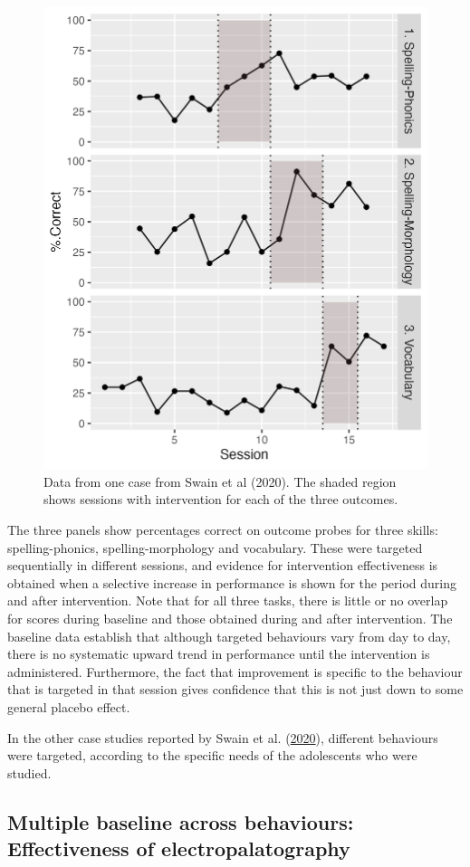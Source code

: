 \documentclass{krantz}
\begin{document}
\begin{figure}
\includegraphics[width=0.6\linewidth]{images_bw/swainplot} \caption{Data from one case from  Swain et al (2020). The shaded region shows sessions with intervention for each of the three outcomes.}\label{fig:swainfig}
\end{figure}

The three panels show percentages correct on outcome probes for three skills: spelling-phonics, spelling-morphology and vocabulary. These were targeted sequentially in different sessions, and evidence for intervention effectiveness is obtained when a selective increase in performance is shown for the period during and after intervention. Note that for all three tasks, there is little or no overlap for scores during baseline and those obtained during and after intervention. The baseline data establish that although targeted behaviours vary from day to day, there is no systematic upward trend in performance until the intervention is administered. Furthermore, the fact that improvement is specific to the behaviour that is targeted in that session gives confidence that this is not just down to some general placebo effect.

In the other case studies reported by Swain et al. (\protect\hyperlink{ref-swain2020}{2020}), different behaviours were targeted, according to the specific needs of the adolescents who were studied.

\hypertarget{multiple-baseline-across-behaviours-effectiveness-of-electropalatography}{%
\subsection{Multiple baseline across behaviours: Effectiveness of electropalatography}\label{Multiple-baseline-across-behaviours-effectiveness-of-electropalatography}}
\end{document}
